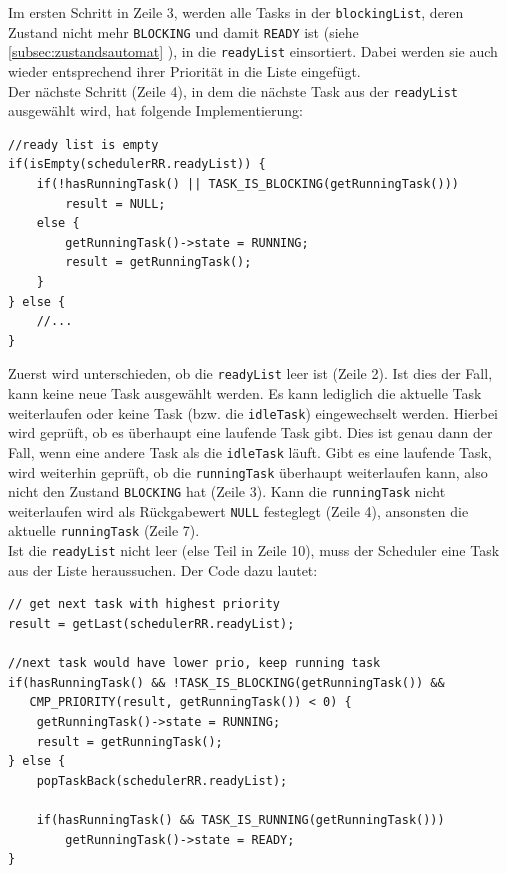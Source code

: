 \documentclass[fontsize=12pt, toc=bibliography, notitlepage]{scrreprt}
\newcommand{\refnn}[1]{\ref{#1} \nameref{#1}}
\begin{document}
Im ersten Schritt in Zeile 3, werden alle Tasks in der \lstinline$blockingList$, deren Zustand nicht mehr \lstinline$BLOCKING$ und damit \lstinline$READY$ ist (siehe \refnn{subsec:zustandsautomat}), in die \lstinline$readyList$ einsortiert. Dabei werden sie auch wieder entsprechend ihrer Priorität in die Liste eingefügt.\\

Der nächste Schritt (Zeile 4), in dem die nächste Task aus der \lstinline$readyList$ ausgewählt wird, hat folgende Implementierung:

\begin{lstlisting}[title=schedulerRR.c]
//ready list is empty
if(isEmpty(schedulerRR.readyList)) {
	if(!hasRunningTask() || TASK_IS_BLOCKING(getRunningTask()))
		result = NULL;
	else {
		getRunningTask()->state = RUNNING;
		result = getRunningTask();
	}
} else {
	//...
}
\end{lstlisting}

Zuerst wird unterschieden, ob die \lstinline$readyList$ leer ist (Zeile 2). Ist dies der Fall, kann keine neue Task ausgewählt werden. Es kann lediglich die aktuelle Task weiterlaufen oder keine Task (bzw. die \lstinline$idleTask$) eingewechselt werden. Hierbei wird geprüft, ob es überhaupt eine laufende Task gibt. Dies ist genau dann der Fall, wenn eine andere Task als die \lstinline$idleTask$ läuft. Gibt es eine laufende Task, wird weiterhin geprüft, ob die \lstinline$runningTask$ überhaupt weiterlaufen kann, also nicht den Zustand \lstinline$BLOCKING$ hat (Zeile 3). Kann die \lstinline$runningTask$ nicht weiterlaufen wird als Rückgabewert \lstinline$NULL$ festeglegt (Zeile 4), ansonsten die aktuelle \lstinline$runningTask$ (Zeile 7).\\

Ist die \lstinline$readyList$ nicht leer (else Teil in Zeile 10), muss der Scheduler eine Task aus der Liste heraussuchen. Der Code dazu lautet:

\begin{lstlisting}[title=schedulerRR.c]
// get next task with highest priority
result = getLast(schedulerRR.readyList);

//next task would have lower prio, keep running task
if(hasRunningTask() && !TASK_IS_BLOCKING(getRunningTask()) &&
   CMP_PRIORITY(result, getRunningTask()) < 0) {
	getRunningTask()->state = RUNNING;
	result = getRunningTask();
} else {
	popTaskBack(schedulerRR.readyList);
	
	if(hasRunningTask() && TASK_IS_RUNNING(getRunningTask()))
		getRunningTask()->state = READY;
}
\end{lstlisting}
\end{document}
